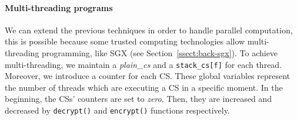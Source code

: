 \paragraph{\textbf{Multi-threading programs}}
We can extend the previous techniques in order to handle parallel computation, 
this is possible because some trusted computing technologies allow 
multi-threading programming, like SGX (see 
Section~\ref{ssect:back-sgx}).
To achieve multi-threading, we maintain a \emph{plain\_cs} and a 
\texttt{stack\_cs[f]} for each thread.
Moreover, we introduce a counter for each CS. %
These global variables represent the number of threads which are executing a CS 
in a specific moment.
In the beginning, the CSs' counters are set to \emph{zero}.
Then, they are increased and decreased by \texttt{decrypt()} and 
\texttt{encrypt()} functions respectively.


%
%

